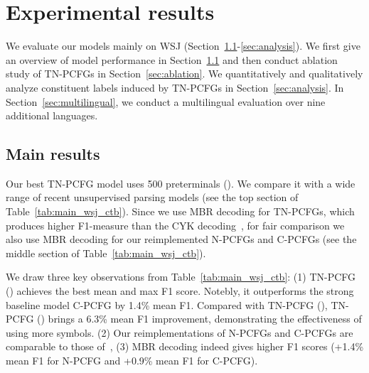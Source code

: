 \documentclass[11pt]{article}
\begin{document}
\begin{table}[h!]\small  
{\setlength{\tabcolsep}{0.4em}
		}
	\caption{\label{tab:time}Average running time per epoch and the parameter number of each model.}
\end{table}









\section{Experimental results}

We evaluate our models mainly on WSJ (Section~\ref{sec:wsj}-\ref{sec:analysis}).
We first give an overview of model performance in Section~\ref{sec:wsj}
and then conduct ablation study of TN-PCFGs in Section~\ref{sec:ablation}.
We quantitatively and qualitatively analyze constituent labels induced by TN-PCFGs in Section~\ref{sec:analysis}.
In Section~\ref{sec:multilingual}, we conduct a multilingual evaluation over nine additional languages.

\subsection{Main results}\label{sec:wsj}
Our best TN-PCFG model uses 500 preterminals ().
We compare it with a wide range of recent unsupervised parsing models (see the top section of Table~\ref{tab:main_wsj_ctb}).
Since we use MBR decoding for TN-PCFGs,
which produces higher F1-measure than the CYK decoding~\citep{goodman-1996-parsing},
for fair comparison we also use MBR decoding for our reimplemented N-PCFGs and C-PCFGs (see the middle section of Table~\ref{tab:main_wsj_ctb}).

We draw three key observations from Table~\ref{tab:main_wsj_ctb}:
(1) TN-PCFG () achieves the best mean and max F1 score. 
Notebly, it outperforms the strong baseline model C-PCFG by 1.4\% mean F1.
Compared with TN-PCFG (),
TN-PCFG () brings a 6.3\% mean F1 improvement,
demonstrating the effectiveness of using more symbols.
(2) Our reimplementations of N-PCFGs and C-PCFGs are comparable to those of~\citet{kim-etal-2019-compound}, 
(3) MBR decoding indeed gives higher F1 scores (+1.4\% mean F1 for N-PCFG and +0.9\% mean F1 for C-PCFG).
\end{document}
